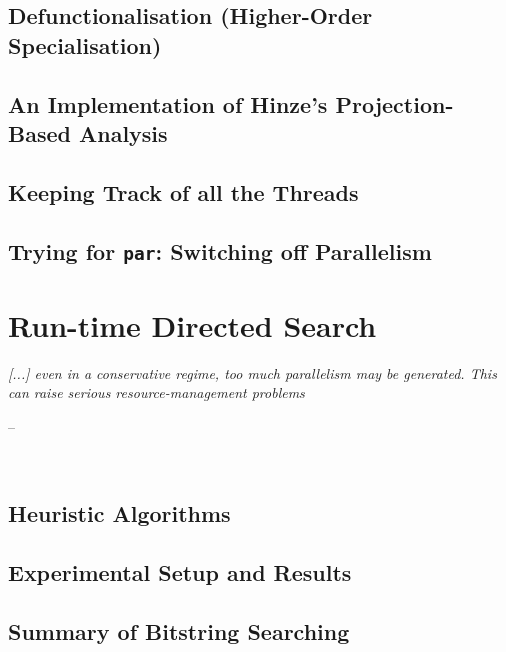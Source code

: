 \documentclass[openright, dottedtoc, headinclude, footinclude=true, a4paper, numbers=noenddot]{scrreprt}
\makeatletter
\newenvironment{chapquote}[2][2em]
  {\setlength{\@tempdima}{#1}%
   \def\chapquote@author{#2}%
   \parshape 1 \@tempdima \dimexpr\textwidth-2\@tempdima\relax%
   \itshape}
  {\par\normalfont\hfill--\ \chapquote@author\hspace*{\@tempdima}\par\noindent\hrulefill\\[1cm]}
\makeatother
\begin{document}
        \section{Defunctionalisation (Higher-Order Specialisation)}
        \label{sec:defunctionalisation}
        
    
        \section{An Implementation of Hinze's Projection-Based Analysis}
        \label{sec:hinzeImplementation}
        
        \section{Keeping Track of all the Threads}
        \label{sec:logging}
        
    
        \section{Trying for \texttt{par}: Switching off Parallelism}
        \label{sec:parSwitching}
        
    
    \chapter{Run-time Directed Search}
    \label{chap:blind}
    \begin{chapquote}{\cite{peyton1987implementation}}
    [...] even in a conservative regime, too much parallelism may be generated.
    This can raise serious resource-management problems
    \end{chapquote}
    
    
        \section{Heuristic Algorithms}
        \label{sec:blind-ParFunc}
        
    
        \section{Experimental Setup and Results}
        \label{sec:blind-Results}
        
    
        \section{Summary of Bitstring Searching}
        \label{sec:blind-Conclusion}
        
    
\end{document}
